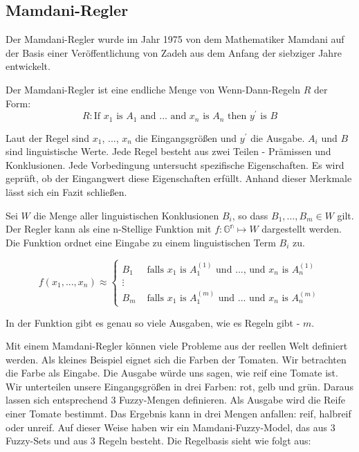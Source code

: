 \subsection{Mamdani-Regler}

Der Mamdani-Regler wurde im Jahr 1975 von dem Mathematiker Mamdani auf der Basis einer Veröffentlichung von Zadeh aus dem Anfang der siebziger Jahre entwickelt. 

Der Mamdani-Regler ist eine endliche Menge von Wenn-Dann-Regeln $R$ der Form:
\begin{equation}
R: \text{If } x_1 \text{ is } A_1 \text{ and ... and } x_n \text{ is } A_n
\text{ then } y^\prime \text{ is } B
\end{equation}

Laut der Regel sind $x_1$, ..., $x_n$ die Eingangsgrößen und $y^\prime$ die Ausgabe. $A_i$ und $B$ sind  linguistische Werte. Jede Regel besteht aus zwei Teilen - Prämissen und Konklusionen. Jede Vorbedingung untersucht spezifische Eigenschaften. Es wird geprüft, ob der Eingangwert diese Eigenschaften erfüllt. Anhand dieser Merkmale lässt sich ein Fazit schließen. 

Sei $W$ die Menge aller linguistischen Konklusionen $B_i$, so dass $B_1, \dots, B_m \in W$ gilt. Der Regler kann als eine n-Stellige Funktion mit $f: \mathbb{G^n} \mapsto W$ dargestellt werden. Die Funktion ordnet eine Eingabe zu einem linguistischen Term $B_i$ zu.

\begin{equation}
f(x_1, ..., x_n) \approx 
\left\{
\begin{array}{ll}
B_1 & \mbox{ falls } x_1 \mbox{ is } A_1^{(1)} \mbox{ und ..., und } x_{n} \mbox{ is } A_n^{(1)}\\
\vdots \\
B_{m} & \mbox{ falls } x_1 \mbox{ is } A_1^{(m)} \mbox{ und ... und } x_{n} \mbox{ is } A_n^{(m)}
\end{array}
\right.
\end{equation}

In der Funktion gibt es genau so viele Ausgaben, wie es Regeln gibt - $m$.

Mit einem Mamdani-Regler können viele Probleme aus der reellen Welt definiert werden. Als kleines Beispiel eignet sich die Farben der Tomaten. Wir betrachten die Farbe als Eingabe. Die Ausgabe würde uns sagen, wie reif eine Tomate ist. Wir unterteilen unsere Eingangsgrößen in drei Farben: rot, gelb und grün. Daraus lassen sich entsprechend 3 Fuzzy-Mengen definieren. Als Ausgabe wird die Reife einer Tomate bestimmt. Das Ergebnis kann in drei Mengen anfallen: reif, halbreif oder unreif. Auf dieser Weise haben wir ein Mamdani-Fuzzy-Model, das aus 3 Fuzzy-Sets und aus 3 Regeln besteht. Die Regelbasis sieht wie folgt aus:

